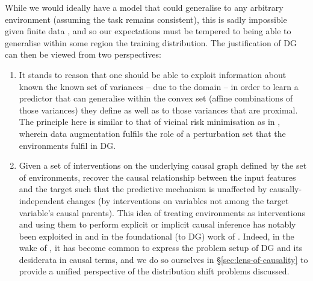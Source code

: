 %
While we would ideally have a model that could generalise to any arbitrary environment (assuming
the task remains consistent), this is sadly impossible given finite data
\citep{david2010impossibility}, and so our expectations must be tempered to being able to generalise
within some region the training distribution.
%
The justification of \ac{DG} can then be viewed from two perspectives:
\begin{enumerate}
        \item
        It stands to reason that one should be able to exploit information about known the known
        set of variances -- due to the domain -- in order to learn a predictor that can generalise
        within the convex set (affine combinations of those variances) they define as well as to
        those variances that are proximal.
        The principle here is similar to that of vicinal risk minimisation
        \citep{chapelle2000vicinal} as in \cite{zhang2017mixup}, wherein data augmentation fulfils
        the role of a perturbation set that the environments fulfil in \ac{DG}.
        \item
        Given a set of interventions on the underlying causal graph defined by the set of
        environments, recover the causal relationship between the input features and the target
        such that the predictive mechanism is unaffected by causally-independent changes (by
        interventions on variables not among the target variable's causal parents).
        This idea of treating environments as interventions and using them to perform explicit or
        implicit causal inference has notably been exploited in \cite{peters2016causal} and in the
        foundational (to \ac{DG}) work of \cite{arjovsky2019invariant}.
        Indeed, in the wake of \cite{arjovsky2019invariant}, it has become common \citep{
        gulrajani2020search, krueger2021out, mahajan2021domain, lin2022zin} to express the problem
        setup of \ac{DG} and its desiderata in causal terms, and we do so ourselves in
        \S\ref{sec:lens-of-causality} to provide a unified perspective of the distribution shift
        problems discussed.
\end{enumerate}

